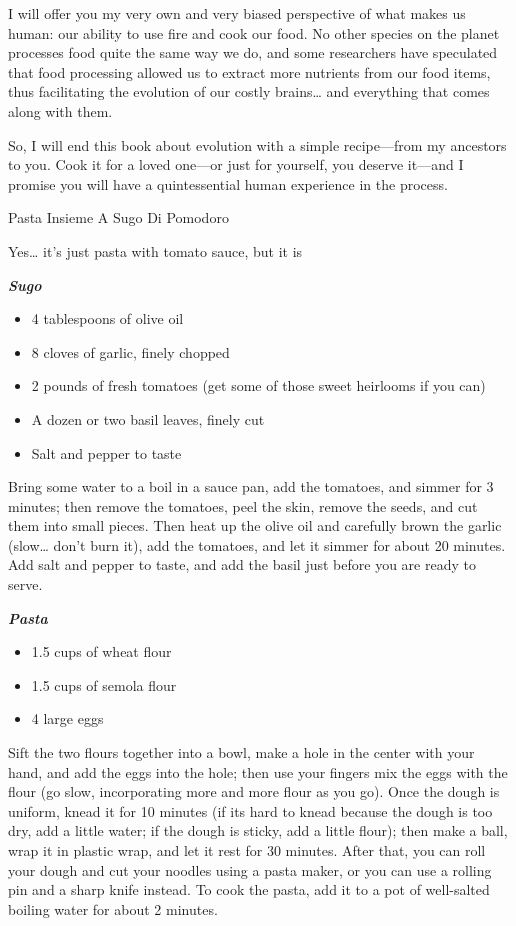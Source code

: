 \documentclass[
]{book}
\begin{document}
I will offer you my very own and very biased perspective of what makes us human: our ability to use fire and cook our food. No other species on the planet processes food quite the same way we do, and some researchers have speculated that food processing allowed us to extract more nutrients from our food items, thus facilitating the evolution of our costly brains\ldots{} and everything that comes along with them.

So, I will end this book about evolution with a simple recipe---from my ancestors to you. Cook it for a loved one---or just for yourself, you deserve it---and I promise you will have a quintessential human experience in the process.

Pasta Insieme A Sugo Di Pomodoro

Yes\ldots{} it's just pasta with tomato sauce, but it is 🤤

\textbf{\emph{Sugo}}

\begin{itemize}
\item
  4 tablespoons of olive oil
\item
  8 cloves of garlic, finely chopped
\item
  2 pounds of fresh tomatoes (get some of those sweet heirlooms if you can)
\item
  A dozen or two basil leaves, finely cut
\item
  Salt and pepper to taste
\end{itemize}

Bring some water to a boil in a sauce pan, add the tomatoes, and simmer for 3 minutes; then remove the tomatoes, peel the skin, remove the seeds, and cut them into small pieces. Then heat up the olive oil and carefully brown the garlic (slow\ldots{} don't burn it), add the tomatoes, and let it simmer for about 20 minutes. Add salt and pepper to taste, and add the basil just before you are ready to serve.

\textbf{\emph{Pasta}}

\begin{itemize}
\item
  1.5 cups of wheat flour
\item
  1.5 cups of semola flour
\item
  4 large eggs
\end{itemize}

Sift the two flours together into a bowl, make a hole in the center with your hand, and add the eggs into the hole; then use your fingers mix the eggs with the flour (go slow, incorporating more and more flour as you go). Once the dough is uniform, knead it for 10 minutes (if its hard to knead because the dough is too dry, add a little water; if the dough is sticky, add a little flour); then make a ball, wrap it in plastic wrap, and let it rest for 30 minutes. After that, you can roll your dough and cut your noodles using a pasta maker, or you can use a rolling pin and a sharp knife instead. To cook the pasta, add it to a pot of well-salted boiling water for about 2 minutes.
\end{document}
